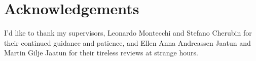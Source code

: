 \section{Acknowledgements}
I'd like to thank my supervisors, Leonardo Montecchi and Stefano Cherubin for their continued guidance and patience, and Ellen Anna Andreassen Jaatun and Martin Gilje Jaatun for their tireless reviews at strange hours. 

